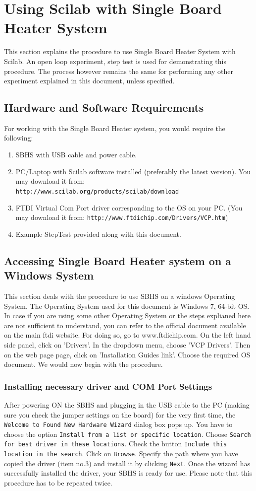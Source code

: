 \chapter{Using Scilab with Single Board Heater System}\label{sercomm}
This section explains the procedure to use Single Board Heater System with Scilab. An open loop experiment, step test is used for demonstrating this procedure. The process however remains the same for performing any other experiment explained in this document, unless specified. 
\section*{Hardware and Software Requirements}\label{umlauts}
For working with the Single Board Heater system, you would require the following:

\begin{enumerate}
\item SBHS with USB cable and power cable.
\item PC/Laptop with Scilab software installed (preferably the latest version). You may download it from:\\ {\tt http://www.scilab.org/products/scilab/download}
\item FTDI Virtual Com Port driver corresponding to the OS on your PC. (You may download it from: 
{\tt http://www.ftdichip.com/Drivers/VCP.htm})
\item Example StepTest provided along with this document.
\end{enumerate}
\section{Accessing Single Board Heater system on a Windows System}
\label{win_procedure}
This section deals with the procedure to use SBHS on a windows Operating System. The Operating System used for this document is Windows 7, 64-bit OS. In case if you are using some other Operating System or the steps explianed here are not sufficient to understand, you can refer to the official document available on  the main ftdi website. For doing so, go to www.ftdichip.com. On the left hand side panel, click on 'Drivers'. In the dropdown menu, choose 'VCP Drivers'. Then on the web page page, click on 'Installation Guides link'. Choose the required OS document. We would now begin with the procedure.
\subsection{Installing necessary driver and COM Port Settings}
After powering ON the SBHS and plugging in the USB cable to the PC (making sure you check the jumper settings on the board) for the very first time, the {\tt Welcome to Found New Hardware Wizard} dialog box pops up. You have to choose the option {\tt Install from a list or specific location}. Choose {\tt Search for best driver in these locations}. Check the button {\tt Include this location in the search}. Click on {\tt Browse}. Specify the path where you have copied the driver (item no.3) and install it by clicking {\tt Next}. Once the wizard has successfully installed the driver, your SBHS is ready for use. Please note that this procedure has to be repeated twice.

